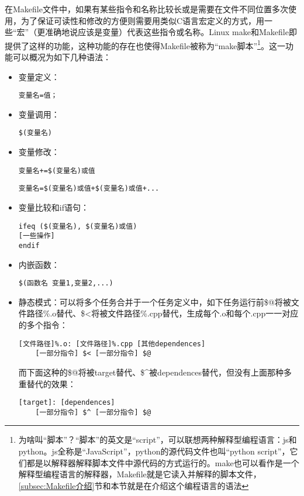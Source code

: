 在Makefile文件中，如果有某些指令和名称比较长或是需要在文件不同位置多次使用，为了保证可读性和修改的方便则需要用类似C语言宏定义的方式，用一些“宏”（更准确地说应该是变量）代表这些指令或名称。Linux make和Makefile即提供了这样的功能，这种功能的存在也使得Makefile被称为“make脚本”\footnote{为啥叫“脚本”？“脚本”的英文是“script”，可以联想两种解释型编程语言：js和python。js全称是“JavaScript”，python的源代码文件也叫“python script”，它们都是以解释器解释脚本文件中源代码的方式运行的。make也可以看作是一个解释型编程语言的解释器，Makefile就是它读入并解释的脚本文件，\ref{subsec:Makefile介绍}节和本节就是在介绍这个编程语言的语法}。这一功能可以概况为如下几种语法：
\begin{itemize}
    \item 变量定义：
    \begin{lstlisting}
变量名=值；
    \end{lstlisting}
    \item 变量调用：
    \begin{lstlisting}
$(变量名)
    \end{lstlisting}
    \item 变量修改：
    \begin{lstlisting}
变量名+=$(变量名)或值
    \end{lstlisting}
    \begin{lstlisting}
变量名=$(变量名)或值+$(变量名)或值+...
    \end{lstlisting}
    \item 变量比较和if语句：
    \begin{lstlisting}
ifeq ($(变量名), $(变量名)或值)
[一些操作]
endif
    \end{lstlisting}
    \item 内嵌函数：
    \begin{lstlisting}
$(函数名 变量1,变量2,...)
    \end{lstlisting}
    \item 静态模式：可以将多个任务合并于一个任务定义中，如下任务运行前{\codefont\$@}将被{\codefont 文件路径\%.o}替代、{\codefont\$<}将被{\codefont 文件路径\%.cpp}替代，生成每个.o和每个.cpp一一对应的多个指令：
    \begin{lstlisting}
[文件路径]%.o: [文件路径]%.cpp [其他dependences]
    [一部分指令] $< [一部分指令] $@
    \end{lstlisting}
    而下面这种的{\codefont\$@}将被{\codefont target}替代、{\codefont\$\^{}}被{\codefont dependences}替代，但没有上面那种多重替代的效果：
    \begin{lstlisting}
[target]: [dependences]
    [一部分指令] $^ [一部分指令] $@
    \end{lstlisting}
\end{itemize}

